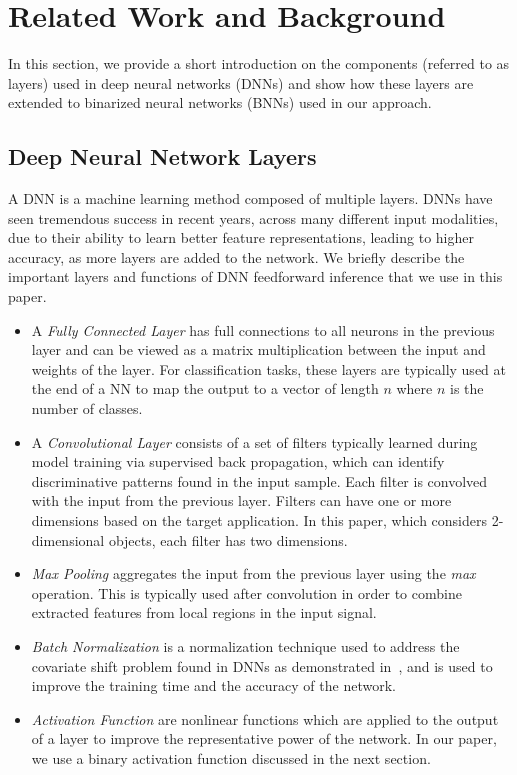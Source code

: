 \documentclass[10pt,emptycopyrightspace]{ewsn-proc}
\begin{document}
\section{Related Work and Background}
\label{sec:background}
In this section, we provide a short introduction on the components (referred to as layers) used in deep neural networks (DNNs) and show how these layers are extended to binarized neural networks (BNNs) used in our approach.

\subsection{Deep Neural Network Layers}
A DNN is a machine learning method composed of multiple layers. DNNs have seen tremendous success in recent years, across many different input modalities, due to their ability to learn better feature representations, leading to higher accuracy, as more layers are added to the network. We briefly describe the important layers and functions of DNN feedforward inference that we use in this paper.

\begin{itemize}
    \item A \textit{Fully Connected Layer} has full connections to all neurons in the previous layer and can be viewed as a matrix multiplication between the input and weights of the layer. For classification tasks, these layers are typically used at the end of a NN to map the output to a vector of length $n$ where $n$ is the number of classes.
    \item A \textit{Convolutional Layer} consists of a set of filters typically learned during model training via supervised back propagation, which can identify discriminative patterns found in the input sample. Each filter is convolved with the input from the previous layer. Filters can have one or more dimensions based on the target application. In this paper, which considers 2-dimensional objects, each filter has two dimensions.
    \item \textit{Max Pooling} aggregates the input from the previous layer using the \textit{max} operation. This is typically used after convolution in order to combine extracted features from local regions in the input signal.
    \item \textit{Batch Normalization} is a normalization technique used to address the covariate shift problem found in DNNs as demonstrated in~\cite{ioffe2015batch}, and is used to improve the training time and the accuracy of the network.
    \item \textit{Activation Function} are nonlinear functions which are applied to the output of a layer to improve the representative power of the network. In our paper, we use a binary activation function discussed in the next section.
\end{itemize}
\end{document}
